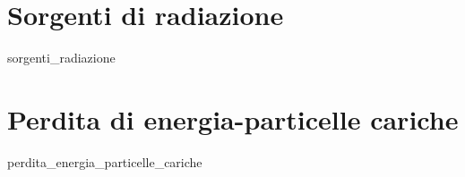 \documentclass[openany,12pt]{book}
\begin{document}
\chapter{Sorgenti di radiazione}
{sorgenti_radiazione}

\chapter{Perdita di energia-particelle cariche}
{perdita_energia_particelle_cariche}

\end{document}
